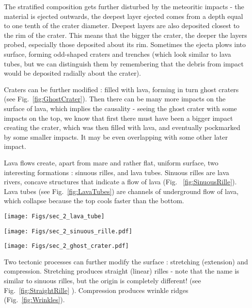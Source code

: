 \documentclass[paper=a4, fontsize=11pt]{scrartcl} %
\numberwithin{equation}{section} %
\begin{document}
The stratified composition gets further disturbed by the meteoritic impacts - the material is ejected outwards, the deepest layer ejected comes from a depth equal to one tenth of the crater diameter.  Deepest layers are also deposited closest to the rim of the crater.  This means that the bigger the crater, the deeper the layers probed, especially those deposited about its rim. Sometimes the ejecta plows into surface, forming odd-shaped craters and trenches (which look similar to lava tubes, but we can distinguish them by remembering that the debris from impact would be deposited radially about the crater). 

Craters  can be further modified : filled with lava, forming in turn ghost craters (see Fig.~\ref{fig:GhostCrater}).  Then there can be many more impacts on the surface of lava, which implies the causality - seeing the ghost crater with some impacts on the top, we know that first there must have been a bigger impact creating the crater, which was then filled with lava, and eventually pockmarked by some smaller impacts. It may be even overlapping with some other later impact. 

Lava flows create, apart from mare and rather flat, uniform surface, two interesting formations : sinuous rilles, and lava tubes. Sinuous rilles are lava rivers, concave structures that indicate a flow of lava (Fig. ~\ref{fig:SinuousRille}).  Lava tubes (see Fig.~\ref{fig:LavaTubes}) are channels of underground flow of lava, which collapse because the top cools faster than the bottom. 


\begin{figure*}
\centering
	\texttt{[image: Figs/sec\_2\_lava\_tube]}
	\caption[LavaTubes]{Lava tubes on the Moon}
	\label{fig:LavaTubes}
\end{figure*}



\begin{figure*}
\centering
	\texttt{[image: Figs/sec\_2\_sinuous\_rille.pdf]}
	\caption[SinuousRille]{Sinuous Rilles on the Moon}
	\label{fig:SinuousRille}
\end{figure*}

\begin{figure*}
\centering
	\texttt{[image: Figs/sec\_2\_ghost\_crater.pdf]}
	\caption[GhostCrater]{Ghost craters on the Moon}
	\label{fig:GhostCrater}
\end{figure*}

Two tectonic processes can further modify the surface  : stretching (extension) and compression.  Stretching produces straight (linear) rilles - note that the name is similar to sinuous rilles, but the origin is completely different! (see Fig.~\ref{fig:StraightRille} ). Compression produces wrinkle ridges (Fig.~\ref{fig:Wrinkles}). 
\end{document}
